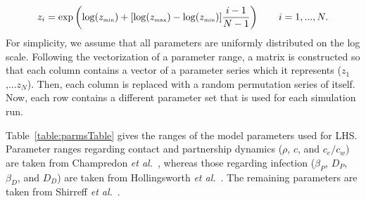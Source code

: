 \documentclass[10pt,letterpaper]{article}
\newcommand{\tsub}[2]{#1_{{\textrm{\tiny #2}}}}
\newcommand{\etal}{\textit{et al.}}
\newcommand{\tsub}[2]{#1_{{\textrm{\tiny #2}}}}
\begin{document}
\begin{equation}
z_i = \exp\left(\log(\tsub{z}{min}) + [\log(\tsub{z}{max}) - \log(\tsub{z}{min})] \frac{i-1}{N-1}\right) \qquad i = 1,...,N.
\end{equation}
For simplicity, we assume that all parameters are uniformly distributed on the log scale. Following the vectorization of a parameter range, a matrix is constructed so that each column contains a vector of a parameter series which it represents ($z_1$,...$z_N$). Then, each column is replaced with a random permutation series of itself. Now, each row contains a different parameter set that is used for each simulation run.

Table~\ref{table:parmsTable} gives the ranges of the model parameters used for LHS. Parameter ranges regarding contact and partnership dynamics ($\rho$, $c$, and $c_e/c_w$) are taken from Champredon \etal\ \cite{champredon_hiv_2013}, whereas those regarding infection ($\beta_P$, $D_P$, $\beta_D$, and $D_D$) are taken from Hollingsworth \etal\ \cite{hollingsworth_hiv1_2008}. The remaining parameters are taken from Shirreff \etal\ \cite{shirreff_transmission_2011}.

\end{document}
